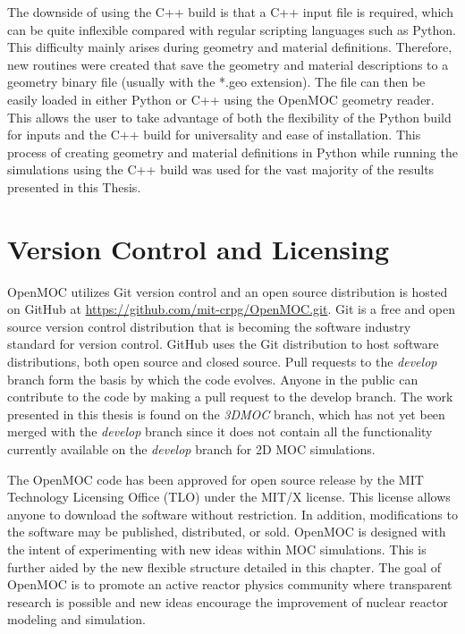 The downside of using the C++ build is that a C++ input file is required, which can be quite inflexible compared with regular scripting languages such as Python. This difficulty mainly arises during geometry and material definitions. Therefore, new routines were created that save the geometry and material descriptions to a geometry binary file (usually with the *.geo extension). The file can then be easily loaded in either Python or C++ using the OpenMOC geometry reader. This allows the user to take advantage of both the flexibility of the Python build for inputs and the C++ build for universality and ease of installation. This process of creating geometry and material definitions in Python while running the simulations using the C++ build was used for the vast majority of the results presented in this Thesis.

\section{Version Control and Licensing}
\label{sec:version-control}

OpenMOC utilizes Git version control and an open source distribution is hosted on GitHub at \url{https://github.com/mit-crpg/OpenMOC.git}. Git is a free and open source version control distribution that is becoming the software industry standard for version control. GitHub uses the Git distribution to host software distributions, both open source and closed source. Pull requests to the \textit{develop} branch form the basis by which the code evolves. Anyone in the public can contribute to the code by making a pull request to the develop branch. The work presented in this thesis is found on the \textit{3DMOC} branch, which has not yet been merged with the \textit{develop} branch since it does not contain all the functionality currently available on the \textit{develop} branch for 2D \ac{MOC} simulations.

The OpenMOC code has been approved for open source release by the MIT Technology Licensing Office (TLO) under the MIT/X license. This license allows anyone to download the software without restriction. In addition, modifications to the software may be published, distributed, or sold. OpenMOC is designed with the intent of experimenting with new ideas within \ac{MOC} simulations. This is further aided by the new flexible structure detailed in this chapter. The goal of OpenMOC is to promote an active reactor physics community where transparent research is possible and new ideas encourage the improvement of nuclear reactor modeling and simulation.

